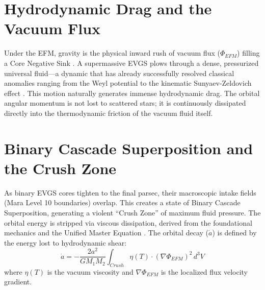 \documentclass[11pt, a4paper]{article}
\begin{document}
\section{Hydrodynamic Drag and the Vacuum Flux}
  Under the EFM, gravity is the physical inward rush of vacuum flux ($\Phi_{EFM}$) filling a Core Negative Sink \cite{marabut2026m4}. A supermassive EVGS plows through a dense, pressurized universal fluid---a dynamic that has already successfully resolved classical anomalies ranging from the Weyl potential \cite{marabut2026m2} to the kinematic Sunyaev-Zeldovich effect \cite{marabut2026m7}. This motion naturally generates immense hydrodynamic drag. The orbital angular momentum is not lost to scattered stars; it is continuously dissipated directly into the thermodynamic friction of the vacuum fluid itself.

\section{Binary Cascade Superposition and the Crush Zone}
  As binary EVGS cores tighten to the final parsec, their macroscopic intake fields (Mara Level 10 boundaries) overlap. This creates a state of Binary Cascade Superposition, generating a violent ``Crush Zone'' of maximum fluid pressure. The orbital energy is stripped via viscous dissipation, derived from the foundational mechanics and the Unified Master Equation \cite{marabut2026m1, marabut2026m8}. The orbital decay ($\dot{a}$) is defined by the energy lost to hydrodynamic shear:
  \begin{equation}
    \dot{a} = -\frac{2 a^2}{G M_1 M_2} \int_{Crush} \eta(T) \cdot (\nabla \Phi_{EFM})^2 \, d^3 V
  \end{equation}
  where $\eta(T)$ is the vacuum viscosity and $\nabla \Phi_{EFM}$ is the localized flux velocity gradient.
\end{document}
